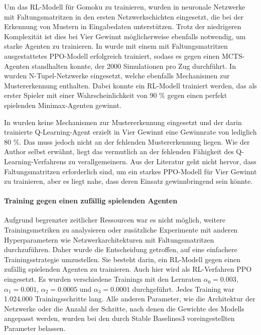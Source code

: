 Um das RL-Modell für Gomoku zu trainieren, wurden in \cite{Zhong.2020} neuronale Netzwerke mit Faltungsmatritzen in den ersten Netzwerkschichten eingesetzt, die bei der Erkennung von Mustern in Eingabedaten unterstützen. Trotz der niedrigeren Komplexität ist dies bei Vier Gewinnt möglicherweise ebenfalls notwendig, um starke Agenten zu trainieren. In \cite{Wäldchen.2022} wurde mit einem mit Faltungsmatritzen ausgestattetes PPO-Modell erfolgreich trainiert, sodass es gegen einen MCTS-Agenten standhalten konnte, der 2000 Simulationen pro Zug durchführt. In \cite{Thill.2012} wurden N-Tupel-Netzwerke eingesetzt, welche ebenfalls Mechanismen zur Mustererkennung enthalten. Dabei konnte ein RL-Modell trainiert werden, das als erster Spieler mit einer Wahrscheinlichkeit von 90 \% gegen einen perfekt spielenden Minimax-Agenten gewinnt.

In \cite{Taylor.2024} wurden keine Mechanismen zur Mustererkennung eingesetzt und der darin trainierte Q-Learning-Agent erzielt in Vier Gewinnt eine Gewinnrate von lediglich 80 \%. Das muss jedoch nicht an der fehlenden Mustererkennung liegen. Wie der Author selbst erwähnt, liegt das vermutlich an der fehlenden Fähigkeit des Q-Learning-Verfahrens zu verallgemeinern. Aus der Literatur geht nicht hervor, dass Faltungsmatritzen erforderlich sind, um ein starkes PPO-Modell für Vier Gewinnt zu trainieren, aber es liegt nahe, dass deren Einsatz gewinnbringend sein könnte.

\paragraph{Training gegen einen zufällig spielenden Agenten}

\label{training-random}

Aufgrund begrenzter zeitlicher Ressourcen war es nicht möglich, weitere Trainingsmetriken zu analysieren oder zusätzliche Experimente mit anderen Hyperparametern wie Netzwerkarchitekturen mit Faltungsmatritzen durchzuführen. Daher wurde die Entscheidung getroffen, auf eine einfachere Trainingsstrategie umzustellen. Sie besteht darin, ein RL-Modell gegen einen zufällig spielenden Agenten zu trainieren. Auch hier wird als RL-Verfahren PPO eingesetzt. Es wurden verschiedene Trainings mit den Lernraten $\alpha_0 = 0.003$, $\alpha_1 = 0.001$, $\alpha_2 = 0.0005$ und $\alpha_3 = 0.0001$ durchgeführt. Jedes Training war 1.024.000 Trainingsschritte lang. Alle anderen Parameter, wie die Architektur der Netzwerke oder die Anzahl der Schritte, nach denen die Gewichte des Modells angepasst werden, wurden bei den durch Stable Baselines3 voreingestellten Parameter belassen.

